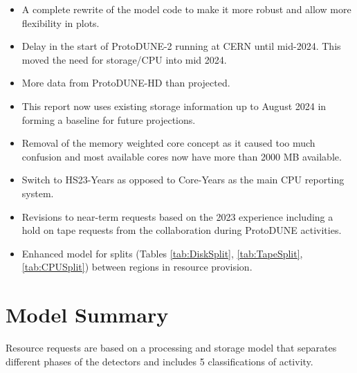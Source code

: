 \documentclass[12pt]{article}
\begin{document}
\begin{itemize}
\item A complete rewrite of the model code to make it more robust and allow more flexibility in plots. 
\item Delay in the start of ProtoDUNE-2 running at CERN until mid-2024. This moved the need for storage/CPU into mid 2024.  
\item More data from ProtoDUNE-HD than projected. 
\item This report now uses existing storage information up to August 2024 in forming a baseline for future projections. 
\item Removal of the memory weighted core concept as it caused too much confusion and most available cores now have more than 2000 MB available. 
\item Switch to HS23-Years as opposed to Core-Years as the main CPU reporting system.
\item Revisions to near-term requests based on the 2023 experience including a hold on tape requests from the collaboration during ProtoDUNE activities. 
\item Enhanced model for splits (Tables \ref{tab:DiskSplit}, \ref{tab:TapeSplit}, \ref{tab:CPUSplit}) between regions in resource provision. 
\end{itemize}

\section{Model Summary}

Resource requests are based on a processing and storage model that separates different phases of the detectors and includes 5 classifications of activity.
\end{document}
